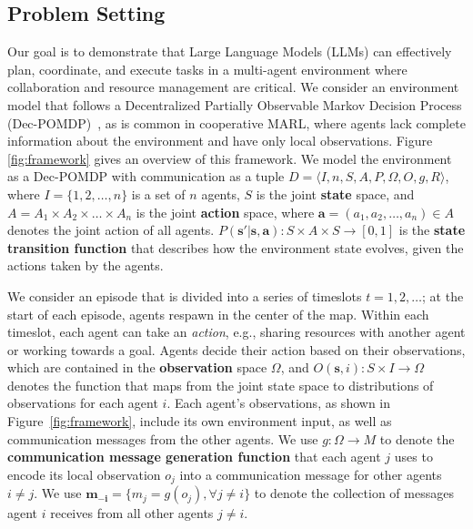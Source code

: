 \subsection{Problem Setting}\label{sec:setting} 
Our goal is to demonstrate that Large Language Models (LLMs) can effectively plan, coordinate, and execute tasks in a multi-agent environment where collaboration and resource management are critical. %
We consider an environment model that follows a Decentralized Partially Observable Markov Decision Process (Dec-POMDP)~\cite{bernstein2002complexity,chen2024rgmcomm}, as is common in cooperative MARL, where agents lack complete information about the environment and have only local observations. Figure \ref{fig:framework} gives an overview of this framework. We model the environment as a Dec-POMDP with communication as a tuple $D=\langle I, n, S, A, P, \Omega, O, g, R \rangle$, where $I = \{1,2,\dots,n\}$ is a set of $n$ agents, $S$ is the joint \textbf{state} space, and $A=A_1\times A_2 \times \dots \times A_n$ is the joint \textbf{action} space, where $\boldsymbol{a}=(a_1,a_2,\dots,a_n)\in A$ denotes the joint action of all agents. $P(\boldsymbol{s}'|\boldsymbol{s},\boldsymbol{a}): S \times A \times S \to [0,1] $ is the \textbf{state transition function} that describes how the environment state evolves, given the actions taken by the agents.

We consider an episode that is divided into a series of timeslots $t = 1,2,\ldots$; at the start of each episode, agents respawn in the center of the map. Within each timeslot, each agent can take an \textit{action}, e.g., sharing resources with another agent or working towards a goal. 
Agents decide their action based on their observations, which are contained in the \textbf{observation} space $\Omega$, and $O(\boldsymbol{s}, i): S \times I \to \Omega$ denotes the function that maps from the joint state space to distributions of observations for each agent $i$.
Each agent's observations, as shown in Figure~\ref{fig:framework}, include its own environment input, as well as communication messages from the other agents. We use $g: \Omega \to M$ to denote the \textbf{communication message generation function} that each agent $j$ uses to encode its local observation $o_j$ into a communication message for other agents $i \neq j$. 
We use $\boldsymbol{m_{-i}}=\{m_{j}=g(o_j), \forall j \neq i\}$ to denote the collection of messages agent $i$ receives from all other agents $j \neq i$. 

